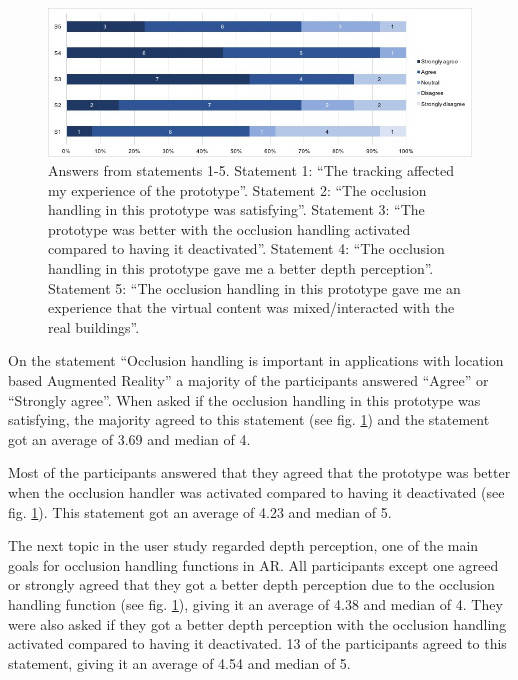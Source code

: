 \begin{figure}
\includegraphics[width=490px]{_image_user-licert}
\caption{Answers from statements 1-5. Statement 1: ``The tracking affected my experience of the prototype''. Statement 2: ``The occlusion handling in this prototype was satisfying''. Statement 3: ``The prototype was better with the occlusion handling activated compared to having it deactivated''. Statement 4: ``The occlusion handling in this prototype gave me a better depth perception''. Statement 5: ``The occlusion handling in this prototype gave me an experience that the virtual content was mixed/interacted with the real buildings''.}
\label{fig:_image_user-licert}
\end{figure}

On the statement ``Occlusion handling is important in applications with location based Augmented Reality'' a majority of the participants answered ``Agree'' or ``Strongly agree''. When asked if the occlusion handling in this prototype was satisfying, the majority agreed to this statement (see fig.  \ref{fig:_image_user-licert}) and the statement got an average of 3.69 and median of 4.

Most of the participants answered that they agreed that the prototype was better when the occlusion handler was activated compared to having it deactivated (see fig. \ref{fig:_image_user-licert}). This statement got an average of 4.23 and median of 5. 

The next topic in the user study regarded depth perception, one of the main goals for occlusion handling functions in AR. All participants except one agreed or strongly agreed that they got a better depth perception due to the occlusion handling function (see fig. \ref{fig:_image_user-licert}), giving it an average of 4.38 and median of 4. They were also asked if they got a better depth perception with the occlusion handling activated compared to having it deactivated. 13 of the participants agreed to this statement, giving it an average of 4.54 and median of 5.

